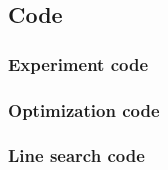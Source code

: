 \documentclass{article}
\begin{document}
\subsection{Code}
\subsubsection{Experiment code}


\subsubsection{Optimization code}


\subsubsection{Line search code}




% 
% 
\end{document}

